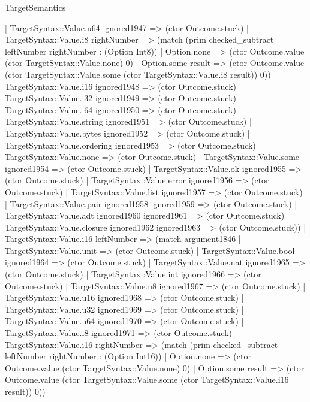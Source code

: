 \begin{lexlean}{TargetSemantics}
\begin{semanticmodule}
{              | TargetSyntax::Value.u64 ignored1947 => (ctor Outcome.stuck)
              | TargetSyntax::Value.i8 rightNumber => (match (prim checked_subtract leftNumber rightNumber : (Option Int8))
                | Option.none => (ctor Outcome.value (ctor TargetSyntax::Value.none) 0)
                | Option.some result => (ctor Outcome.value (ctor TargetSyntax::Value.some (ctor TargetSyntax::Value.i8 result)) 0))
              | TargetSyntax::Value.i16 ignored1948 => (ctor Outcome.stuck)
              | TargetSyntax::Value.i32 ignored1949 => (ctor Outcome.stuck)
              | TargetSyntax::Value.i64 ignored1950 => (ctor Outcome.stuck)
              | TargetSyntax::Value.string ignored1951 => (ctor Outcome.stuck)
              | TargetSyntax::Value.bytes ignored1952 => (ctor Outcome.stuck)
              | TargetSyntax::Value.ordering ignored1953 => (ctor Outcome.stuck)
              | TargetSyntax::Value.none => (ctor Outcome.stuck)
              | TargetSyntax::Value.some ignored1954 => (ctor Outcome.stuck)
              | TargetSyntax::Value.ok ignored1955 => (ctor Outcome.stuck)
              | TargetSyntax::Value.error ignored1956 => (ctor Outcome.stuck)
              | TargetSyntax::Value.list ignored1957 => (ctor Outcome.stuck)
              | TargetSyntax::Value.pair ignored1958 ignored1959 => (ctor Outcome.stuck)
              | TargetSyntax::Value.adt ignored1960 ignored1961 => (ctor Outcome.stuck)
              | TargetSyntax::Value.closure ignored1962 ignored1963 => (ctor Outcome.stuck))
            | TargetSyntax::Value.i16 leftNumber => (match argument1846
              | TargetSyntax::Value.unit => (ctor Outcome.stuck)
              | TargetSyntax::Value.bool ignored1964 => (ctor Outcome.stuck)
              | TargetSyntax::Value.nat ignored1965 => (ctor Outcome.stuck)
              | TargetSyntax::Value.int ignored1966 => (ctor Outcome.stuck)
              | TargetSyntax::Value.u8 ignored1967 => (ctor Outcome.stuck)
              | TargetSyntax::Value.u16 ignored1968 => (ctor Outcome.stuck)
              | TargetSyntax::Value.u32 ignored1969 => (ctor Outcome.stuck)
              | TargetSyntax::Value.u64 ignored1970 => (ctor Outcome.stuck)
              | TargetSyntax::Value.i8 ignored1971 => (ctor Outcome.stuck)
              | TargetSyntax::Value.i16 rightNumber => (match (prim checked_subtract leftNumber rightNumber : (Option Int16))
                | Option.none => (ctor Outcome.value (ctor TargetSyntax::Value.none) 0)
                | Option.some result => (ctor Outcome.value (ctor TargetSyntax::Value.some (ctor TargetSyntax::Value.i16 result)) 0))
}
\end{semanticmodule}
\end{lexlean}
